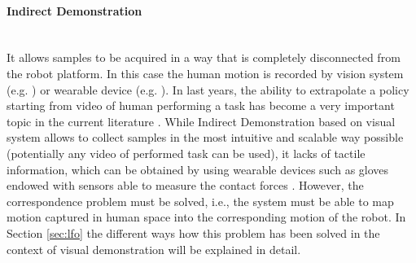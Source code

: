 \paragraph{Indirect Demonstration}  \mbox{} \\ 
It allows samples to be acquired in a way that is completely disconnected from the robot platform. In this case the human motion is recorded by vision system (e.g. \cite{smith2019avid,sermanet2018time_contrastive}) or wearable device (e.g. \cite{liu2019_mirroring_without_overimitation}). In last years, the ability to extrapolate a policy starting from video of human performing a task has become a very important topic in the current literature \cite{fang2019survey,torabi2019recent_advances_lfo}. While Indirect Demonstration based on visual system allows to collect samples in the most intuitive and scalable way possible (potentially any video of performed task can be used), it lacks of tactile information, which can be obtained by using wearable devices such as gloves endowed with sensors able to measure the contact forces \cite{liu2017glove_force}. However, the correspondence problem must be solved, i.e., the system must be able to map motion captured in human space into the corresponding motion of the robot. In Section \ref{sec:lfo} the different ways how this problem has been solved in the context of visual demonstration will be explained in detail.
